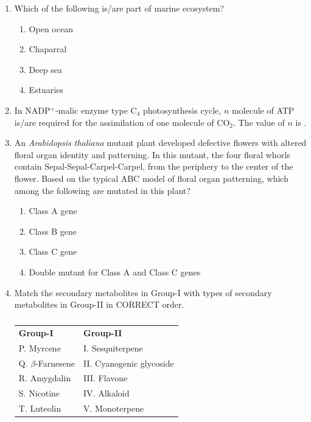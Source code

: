 \documentclass[journal,12pt,onecolumn]{IEEEtran}
\theoremstyle{remark}
\begin{document}
\begin{enumerate}
    \item Which of the following is/are part of marine ecosystem?

    \hfill{}
    \begin{enumerate}
        \item Open ocean
        \item Chaparral
        \item Deep sea
        \item Estuaries
    \end{enumerate}

    \item In NADP$^{+}$-malic enzyme type C$_4$ photosynthesis cycle, $n$ molecule of ATP is/are required for the assimilation of one molecule of CO$_2$. The value of $n$ is \underline{\hspace{2cm}} .

    \hfill{}

    \item An \textit{Arabidopsis thaliana} mutant plant developed defective flowers with altered floral organ identity and patterning. In this mutant, the four floral whorls contain Sepal-Sepal-Carpel-Carpel, from the periphery to the center of the flower. Based on the typical ABC model of floral organ patterning, which among the following are mutated in this plant?

    \hfill{}
    \begin{enumerate}
        \item Class A gene
        \item Class B gene
        \item Class C gene
        \item Double mutant for Class A and Class C genes
    \end{enumerate}

    \item Match the secondary metabolites in Group-I with types of secondary metabolites in Group-II in CORRECT order.
    \begin{table}[h!]
    \centering
    \caption*{}
    \label{tab:q56}
    \begin{tabular}{ll}
        \textbf{Group-I} & \textbf{Group-II} \\
        P. Myrcene & I. Sesquiterpene \\
        Q. $\beta$-Farnesene & II. Cyanogenic glycoside \\
        R. Amygdalin & III. Flavone \\
        S. Nicotine & IV. Alkaloid \\
        T. Luteolin & V. Monoterpene \\
    \end{tabular}
    \end{table}


\end{enumerate}
\end{document}

